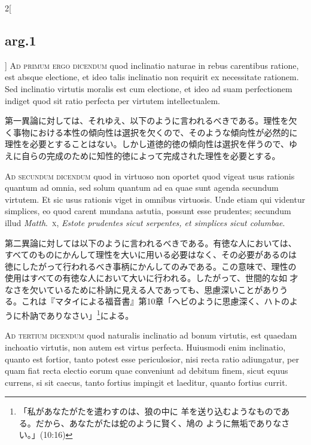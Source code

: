 \documentclass[paper=a4paper,fontsize=10pt,jafontsize=9pt,titlepage]{jlreq}
\begin{document}
\begin{paracol}{2}[\subsection{arg.1}]
{\scshape Ad primum ergo dicendum} quod inclinatio naturae in rebus
carentibus ratione, est absque electione, et ideo talis inclinatio non
requirit ex necessitate rationem. Sed inclinatio virtutis moralis est
cum electione, et ideo ad suam perfectionem indiget quod sit ratio
perfecta per virtutem intellectualem.

\switchcolumn

第一異論に対しては、それゆえ、以下のように言われるべきである。理性を欠
く事物における本性の傾向性は選択を欠くので、そのような傾向性が必然的に
理性を必要とすることはない。しかし道徳的徳の傾向性は選択を伴うので、ゆ
えに自らの完成のために知性的徳によって完成された理性を必要とする。

\switchcolumn*[\subsection{ad.2}]

{\scshape Ad secundum dicendum} quod in virtuoso non oportet quod
vigeat usus rationis quantum ad omnia, sed solum quantum ad ea quae
sunt agenda secundum virtutem. Et sic usus rationis viget in omnibus
virtuosis. Unde etiam qui videntur simplices, eo quod carent mundana
astutia, possunt esse prudentes; secundum illud {\itshape
Matth}.~{\scshape x}, {\itshape Estote prudentes sicut serpentes, et
simplices sicut columbae}.

\switchcolumn

第二異論に対しては以下のように言われるべきである。有徳な人においては、
すべてのものにかんして理性を大いに用いる必要はなく、その必要があるのは
徳にしたがって行われるべき事柄にかんしてのみである。この意味で、理性の
使用はすべての有徳な人において大いに行われる。したがって、世間的な如
才なさを欠いているために朴訥に見える人であっても、思慮深いことがありう
る。これは『マタイによる福音書』第10章「ヘビのように思慮深く、ハトのよ
うに朴訥でありなさい」\footnote{「私があなたがたを遣わすのは、狼の中に
羊を送り込むようなものである。だから、あなたがたは蛇のように賢く、鳩の
ように無垢でありなさい。」(10:16)}による。

\switchcolumn*[\subsection{ad.3}]

{\scshape Ad tertium dicendum} quod naturalis inclinatio ad bonum
virtutis, est quaedam inchoatio virtutis, non autem est virtus
perfecta. Huiusmodi enim inclinatio, quanto est fortior, tanto potest
esse periculosior, nisi recta ratio adiungatur, per quam fiat recta
electio eorum quae conveniunt ad debitum finem, sicut equus currens,
si sit caecus, tanto fortius impingit et laeditur, quanto fortius
currit.


\end{paracol}
\end{document}
